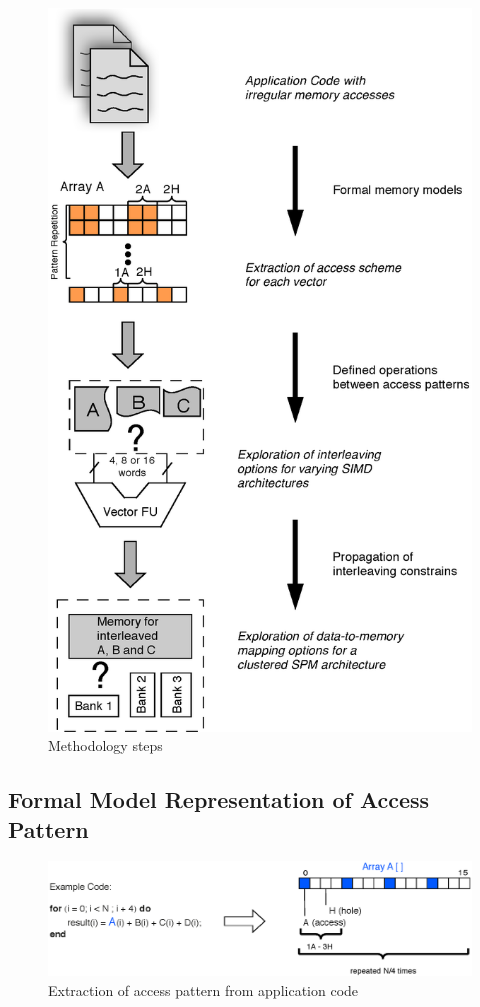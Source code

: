 \documentclass[prodmode,acmtodaes]{acmsmall}
\begin{document}
\begin{figure}
\centering
	\caption{Methodology steps}
	\label{fig:workflow}
	\includegraphics[scale = 0.5]{Images/Workflow.eps} 
\end{figure}

\subsection{Formal Model Representation of Access Pattern }

\begin{figure}
\centering
	\caption{Extraction of access pattern from application code}
	\label{fig:pattern}
	\includegraphics[scale = 0.5]{Images/AHpattern.eps} 
\end{figure}
\end{document}
